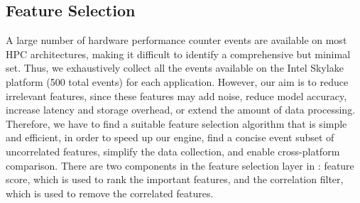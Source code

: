 \subsection{Feature Selection}
A large number of hardware performance counter events are available on most HPC architectures, making it difficult to identify a comprehensive but minimal set. Thus, we exhaustively collect all the events available on the Intel Skylake platform (500 total events) for each application.
However, our aim is to reduce irrelevant features, since these features may add noise, reduce model accuracy, increase latency and storage overhead, or extend the amount of data processing. 
Therefore, we have to find a suitable feature selection algorithm that is simple and efficient, in order to speed up our engine, 
find a concise event subset of uncorrelated features, simplify the data collection, and enable cross-platform comparison. There are two components in the feature selection layer in \us: feature score, which is used to rank the important features, and the correlation filter, which is used to remove the correlated features. 

